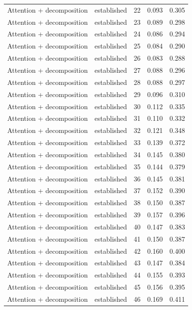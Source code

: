 \begin{tabular}{llrrr}
Attention + decomposition & established & 22 & 0.093 & 0.305 \\
Attention + decomposition & established & 23 & 0.089 & 0.298 \\
Attention + decomposition & established & 24 & 0.086 & 0.294 \\
Attention + decomposition & established & 25 & 0.084 & 0.290 \\
Attention + decomposition & established & 26 & 0.083 & 0.288 \\
Attention + decomposition & established & 27 & 0.088 & 0.296 \\
Attention + decomposition & established & 28 & 0.088 & 0.297 \\
Attention + decomposition & established & 29 & 0.096 & 0.310 \\
Attention + decomposition & established & 30 & 0.112 & 0.335 \\
Attention + decomposition & established & 31 & 0.110 & 0.332 \\
Attention + decomposition & established & 32 & 0.121 & 0.348 \\
Attention + decomposition & established & 33 & 0.139 & 0.372 \\
Attention + decomposition & established & 34 & 0.145 & 0.380 \\
Attention + decomposition & established & 35 & 0.144 & 0.379 \\
Attention + decomposition & established & 36 & 0.145 & 0.381 \\
Attention + decomposition & established & 37 & 0.152 & 0.390 \\
Attention + decomposition & established & 38 & 0.150 & 0.387 \\
Attention + decomposition & established & 39 & 0.157 & 0.396 \\
Attention + decomposition & established & 40 & 0.147 & 0.383 \\
Attention + decomposition & established & 41 & 0.150 & 0.387 \\
Attention + decomposition & established & 42 & 0.160 & 0.400 \\
Attention + decomposition & established & 43 & 0.147 & 0.384 \\
Attention + decomposition & established & 44 & 0.155 & 0.393 \\
Attention + decomposition & established & 45 & 0.156 & 0.395 \\
Attention + decomposition & established & 46 & 0.169 & 0.411 \\

\end{tabular}
